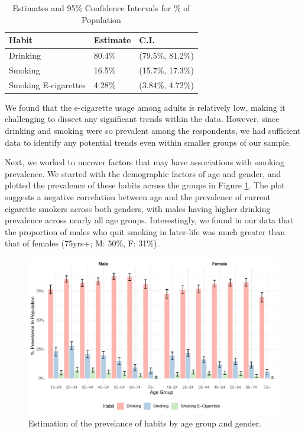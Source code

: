\documentclass[
  11pt,
  twocolumn]{article}
\begin{document}
\begin{table}

\caption{\label{tab:outputestimatestable}Estimates and 95\% Confidence Intervals for \% of Population\label{tab:output-estimates-table}}
\centering
\fontsize{7}{9}\selectfont
\begin{tabular}[t]{l|l|l}
\hline
\textbf{Habit} & \textbf{Estimate} & \textbf{C.I.}\\
\hline
Drinking & 80.4\% & (79.5\%, 81.2\%)\\
\hline
Smoking & 16.5\% & (15.7\%, 17.3\%)\\
\hline
Smoking E-cigarettes & 4.28\% & (3.84\%, 4.72\%)\\
\hline
\end{tabular}
\end{table}

We found that the e-cigarette usage among adults is relatively low,
making it challenging to dissect any significant trends within the data.
However, since drinking and smoking were so prevalent among the
respondents, we had sufficient data to identify any potential trends
even within smaller groups of our sample.

Next, we worked to uncover factors that may have associations with
smoking prevalence. We started with the demographic factors of age and
gender, and plotted the prevalence of these habits across the groups in
Figure \ref{fig:output-prevelance-plot}. The plot suggests a negative
correlation between age and the prevalence of current cigarette smokers
across both genders, with males having higher drinking prevalence across
nearly all age groups. Interestingly, we found in our data that the
proportion of males who quit smoking in later-life was much greater than
that of females (75yrs+; M: 50\%, F: 31\%).

\begin{figure}[H]
\includegraphics{Coursework_files/figure-latex/output-prevelance-plot-1} \caption{Estimation of the prevelance of habits by age group and gender.}\label{fig:output-prevelance-plot}
\end{figure}
\end{document}
